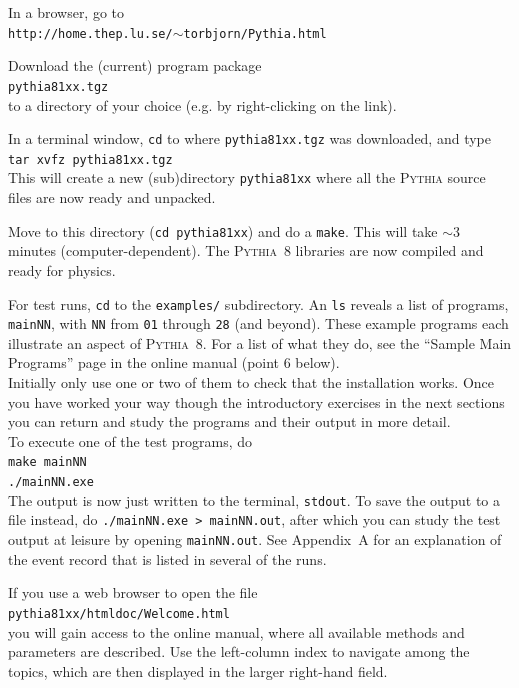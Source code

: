 \documentclass[12pt,a4paper]{article}
\newcounter{enumct}
\newenvironment{Enumerate}{\begin{list}{\arabic{enumct}.}%
{\usecounter{enumct}\setlength{\topsep}{0.4mm}%
\setlength{\partopsep}{0.4mm}\setlength{\itemsep}{0.4mm}%
\setlength{\parsep}{0.4mm}}}{\end{list}}
\begin{document}
\begin{Enumerate}
\item In a browser, go to\\
\hspace*{10mm}\texttt{http://home.thep.lu.se/$\sim$torbjorn/Pythia.html}
\item Download the (current) program package\\
\hspace*{10mm}\texttt{pythia81xx.tgz}\\
to a directory of your choice (e.g. by right-clicking on the link).
\item In a terminal window, \texttt{cd} to where \texttt{pythia81xx.tgz} 
was downloaded, and type\\
\hspace*{10mm}\texttt{tar xvfz pythia81xx.tgz}\\
This will create a new (sub)directory \texttt{pythia81xx} where all
the \textsc{Pythia} source files are now ready and unpacked.
\item Move to this directory (\texttt{cd pythia81xx}) and do a
\texttt{make}. This will take $\sim$3 minutes
(computer-dependent). The \textsc{Pythia}~8 libraries are now
compiled and ready for physics. 
\item For test runs, \texttt{cd} to the \texttt{examples/} subdirectory. 
An \texttt{ls} reveals a list of programs, \texttt{mainNN}, with
\texttt{NN} from \texttt{01} through \texttt{28} (and beyond). These 
example programs each illustrate an aspect of \textsc{Pythia}~8. 
For a list of what they do, see the ``Sample Main Programs'' page 
in the online manual (point 6 below).\\ 
Initially only use one or two of them to check that the installation
 works. Once you have worked your way though the introductory exercises 
in the next sections you can return and study the programs and their 
output in more detail.\\
To execute one of the test programs, do\\
\hspace*{10mm}\texttt{make mainNN}\\
\hspace*{10mm}\texttt{./mainNN.exe}\\
The output is now just written to the terminal, \texttt{stdout}. 
To save the output to a file instead, do 
\texttt{./mainNN.exe >  mainNN.out}, after which you can study the 
test output at leisure by opening \texttt{mainNN.out}. See Appendix~A 
for an explanation of the event record that is listed in several of 
the runs.
\item If you use a web browser to open the file\\
\hspace*{10mm}\texttt{pythia81xx/htmldoc/Welcome.html}\\
you will gain access to the online manual, where all available methods 
and parameters are described. Use the left-column index to navigate among 
the topics, which are then displayed in the larger right-hand field. 
\end{Enumerate}
\end{document}
